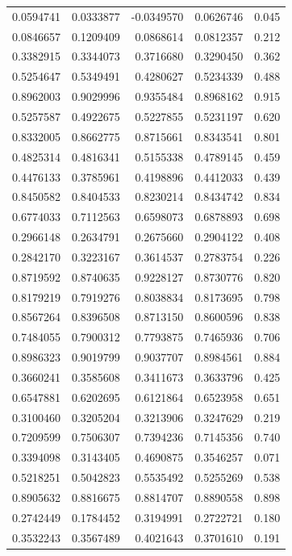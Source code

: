 \documentclass[
  letterpaper,
  DIV=11,
  numbers=noendperiod]{scrartcl}
\begin{document}
\begin{longtable}[]{@{}rrrrr@{}}
0.0594741 & 0.0333877 & -0.0349570 & 0.0626746 & 0.045 \\
0.0846657 & 0.1209409 & 0.0868614 & 0.0812357 & 0.212 \\
0.3382915 & 0.3344073 & 0.3716680 & 0.3290450 & 0.362 \\
0.5254647 & 0.5349491 & 0.4280627 & 0.5234339 & 0.488 \\
0.8962003 & 0.9029996 & 0.9355484 & 0.8968162 & 0.915 \\
0.5257587 & 0.4922675 & 0.5227855 & 0.5231197 & 0.620 \\
0.8332005 & 0.8662775 & 0.8715661 & 0.8343541 & 0.801 \\
0.4825314 & 0.4816341 & 0.5155338 & 0.4789145 & 0.459 \\
0.4476133 & 0.3785961 & 0.4198896 & 0.4412033 & 0.439 \\
0.8450582 & 0.8404533 & 0.8230214 & 0.8434742 & 0.834 \\
0.6774033 & 0.7112563 & 0.6598073 & 0.6878893 & 0.698 \\
0.2966148 & 0.2634791 & 0.2675660 & 0.2904122 & 0.408 \\
0.2842170 & 0.3223167 & 0.3614537 & 0.2783754 & 0.226 \\
0.8719592 & 0.8740635 & 0.9228127 & 0.8730776 & 0.820 \\
0.8179219 & 0.7919276 & 0.8038834 & 0.8173695 & 0.798 \\
0.8567264 & 0.8396508 & 0.8713150 & 0.8600596 & 0.838 \\
0.7484055 & 0.7900312 & 0.7793875 & 0.7465936 & 0.706 \\
0.8986323 & 0.9019799 & 0.9037707 & 0.8984561 & 0.884 \\
0.3660241 & 0.3585608 & 0.3411673 & 0.3633796 & 0.425 \\
0.6547881 & 0.6202695 & 0.6121864 & 0.6523958 & 0.651 \\
0.3100460 & 0.3205204 & 0.3213906 & 0.3247629 & 0.219 \\
0.7209599 & 0.7506307 & 0.7394236 & 0.7145356 & 0.740 \\
0.3394098 & 0.3143405 & 0.4690875 & 0.3546257 & 0.071 \\
0.5218251 & 0.5042823 & 0.5535492 & 0.5255269 & 0.538 \\
0.8905632 & 0.8816675 & 0.8814707 & 0.8890558 & 0.898 \\
0.2742449 & 0.1784452 & 0.3194991 & 0.2722721 & 0.180 \\
0.3532243 & 0.3567489 & 0.4021643 & 0.3701610 & 0.191 \\

\end{longtable}
\end{document}
